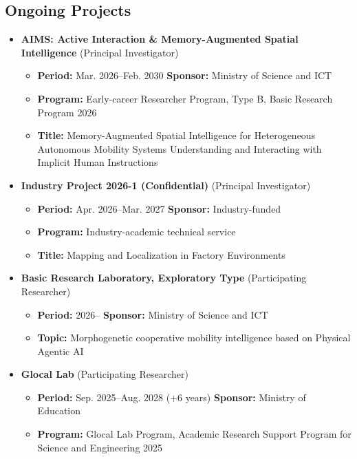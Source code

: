 \documentclass[10pt,a4paper]{article}
\begin{document}
\subsection{Ongoing Projects}
\begin{itemize}[leftmargin=4.5mm,itemsep=4pt]
\item \textbf{AIMS: Active Interaction \& Memory-Augmented Spatial Intelligence} (Principal Investigator)
  \begin{itemize}[label=--,leftmargin=5mm,itemsep=0pt,topsep=1pt]
  \item \textbf{Period:} Mar. 2026--Feb. 2030 \quad \textbf{Sponsor:} Ministry of Science and ICT
  \item \textbf{Program:} Early-career Researcher Program, Type B, Basic Research Program 2026
  \item \textbf{Title:} Memory-Augmented Spatial Intelligence for Heterogeneous Autonomous Mobility Systems Understanding and Interacting with Implicit Human Instructions
  \end{itemize}
\item \textbf{Industry Project 2026-1 (Confidential)} (Principal Investigator)
  \begin{itemize}[label=--,leftmargin=5mm,itemsep=0pt,topsep=1pt]
  \item \textbf{Period:} Apr. 2026--Mar. 2027 \quad \textbf{Sponsor:} Industry-funded
  \item \textbf{Program:} Industry-academic technical service
  \item \textbf{Title:} Mapping and Localization in Factory Environments
  \end{itemize}
\item \textbf{Basic Research Laboratory, Exploratory Type} (Participating Researcher)
  \begin{itemize}[label=--,leftmargin=5mm,itemsep=0pt,topsep=1pt]
  \item \textbf{Period:} 2026-- \quad \textbf{Sponsor:} Ministry of Science and ICT
  \item \textbf{Topic:} Morphogenetic cooperative mobility intelligence based on Physical Agentic AI
  \end{itemize}
\item \textbf{Glocal Lab} (Participating Researcher)
  \begin{itemize}[label=--,leftmargin=5mm,itemsep=0pt,topsep=1pt]
  \item \textbf{Period:} Sep. 2025--Aug. 2028 (+6 years) \quad \textbf{Sponsor:} Ministry of Education
  \item \textbf{Program:} Glocal Lab Program, Academic Research Support Program for Science and Engineering 2025

\end{itemize}
\end{itemize}
\end{document}

